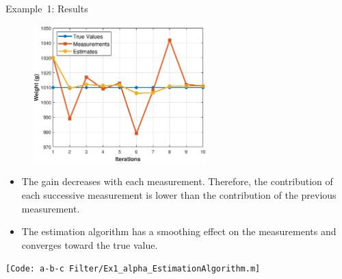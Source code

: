 \begin{frame}{Example~1: Results}
        \begin{figure}
		    \centering
		    \includegraphics[width=0.6\textwidth]{Figures/Chapter1/ex1_estimationAlgorithm.eps}
		    \label{fig:ex1_estimationAlgorithm}
	    \end{figure}
    
    \begin{itemize}
        \item     The gain decreases with each measurement. Therefore, the contribution of each successive measurement is lower than the contribution of the previous measurement.
        \item  The estimation algorithm has a smoothing effect on the measurements and converges toward the true value.
    \end{itemize}

\texttt{\tiny [Code: a-b-c Filter/Ex1\_alpha\_EstimationAlgorithm.m]}

\end{frame}

